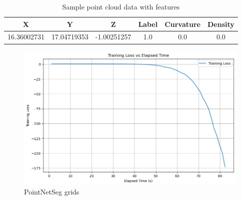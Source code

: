 \documentclass[../report.tex]{subfiles}
\begin{document}
\begin{table}[h!]
\centering
\begin{tabular}{cccccc}
\toprule
X & Y & Z & Label & Curvature & Density \\
\midrule
16.36002731 & 17.04719353 & -1.00251257 & 1.0 & 0.0 & 0.0 \\
\bottomrule
\end{tabular}
\caption{Sample point cloud data with features}
\end{table}
\begin{figure}
    \centering
    \includegraphics[width=0.7\linewidth]{rnd-project-report-main/figures/PointNetSeg_grids.png}
    \caption{PointNetSeg grids}
    \label{fig:enter-label}
\end{figure}
\end{document}

